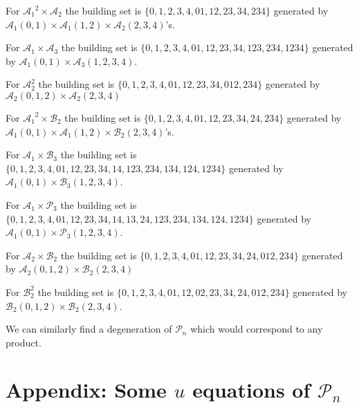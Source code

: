 \documentclass[hidelinks,12pt]{article}
\begin{document}
For ${\mathscr A_1}^{2} \times {\mathscr A_2}$ the building set is $ \{ {0},{1},{2},{3},{4},{01},{12},{23},{34},{234} \}$ generated by ${\mathscr A_1}(0,1)\times {\mathscr A_1}(1,2) \times {\mathscr A_2}(2,3,4)$'s.

For  ${\mathscr A_1} \times {\mathscr A_3}$ the building set is $ \{ {0},{1},{2},{3},{4},{01},{12},{23},{34},{123},{234},{1234} \}$ generated by  ${\mathscr A_1}(0,1)\times {\mathscr A_3}(1,2,3,4)$.

For  ${\mathscr A_2^{2}}$ the building set is $ \{ {0},{1},{2},{3},{4},{01},{12},{23},{34} ,{012},{234}\}$ generated by ${\mathscr A_2}(0,1,2)\times {\mathscr A_2}(2,3,4)$

For ${\mathscr A_1}^{2} \times {\mathscr B_2}$ the building set is $ \{ {0},{1},{2},{3},{4},{01},{12},{23},{34},{24},{234} \}$ generated by ${\mathscr A_1}(0,1)\times {\mathscr A_1}(1,2) \times {\mathscr B_2}(2,3,4)$'s.

For ${\mathscr A_1} \times {\mathscr B_3}$ the building set is $ \{ {0},{1},{2},{3},{4},{01},{12},{23},{34},{14},{123},{234},{134},{124},{1234} \}$ generated by  ${\mathscr A_1}(0,1)\times {\mathscr B_3}(1,2,3,4)$.

For ${\mathscr A_1} \times {\mathscr P_3}$ the building set is $ \{ {0},{1},{2},{3},{4},{01},{12},{23},{34},{14},{13},{24},{123},{234},{134},{124},{1234} \}$ generated by  ${\mathscr A_1}(0,1)\times {\mathscr P_3}(1,2,3,4)$.

For ${\mathscr A_2} \times {\mathscr B_2}$ the building set is $ \{ {0},{1},{2},{3},{4},{01},{12},{23},{34},{24},{012},{234}\}$ generated by ${\mathscr A_2}(0,1,2)\times {\mathscr B_2}(2,3,4)$

For ${\mathscr B_2^{2}}$ the building set is $ \{ {0},{1},{2},{3},{4},{01},{12},{02},{23},{34},{24} ,{012},{234}\}$ generated by ${\mathscr B_2}(0,1,2)\times {\mathscr B_2}(2,3,4)$.

We can similarly find a degeneration of ${\mathscr P_n}$ which would correspond to any product.

\section{Appendix: Some $u$ equations of ${\mathscr P_n}$}\label{appendix:B}
\end{document}
